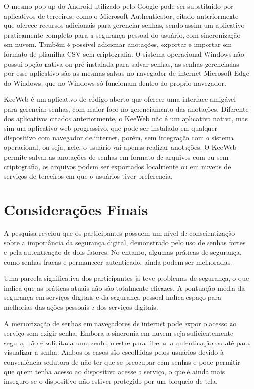 \documentclass[12pt]{article}
\begin{document}
O mesmo pop-up do Android utilizado pelo Google pode ser substituido por
aplicativos de terceiros, como o Microsoft Authenticator, citado anteriormente
que oferece recursos adicionais para gerenciar senhas, sendo assim um aplicativo
praticamente completo para a segurança pessoal do usuário, com sincronização em
nuvem.
Também é possível adicionar anotações, exportar e importar em formato de
plianilha CSV sem criptografia.
O sistema operacional Windows não possui opção nativa ou pré instalada para
salvar senhas, as senhas gerenciadas por esse aplicativo são as mesmas salvas no
navegador de internet Microsoft Edge do Windows, que no Windows só funcionam
dentro do proprio navegador.

KeeWeb é um aplicativo de código aberto que oferece uma interface amigável para
gerenciar senhas, com maior foco no gerenciamento das anotações.
Diferente dos aplicativos citados anteriormente, o KeeWeb não é um aplicativo
nativo, mas sim um aplicativo web progressivo, que pode ser instalado em qualquer
dispositivo com navegador de internet, porém, sem integração com o sistema
operacional, ou seja, nele, o usuário vai apenas realizar anotações.
O KeeWeb permite salvar as anotações de senhas em formato de arquivos com ou sem
criptografia, os arquivos podem ser exportados localmente ou em nuvens de
serviços de terceiros em que o usuários tiver preferencia.

\section{Considerações Finais}

A pesquisa revelou que os participantes possuem um nível de conscientização sobre
a importância da segurança digital, demonstrado pelo uso de senhas fortes e pela
autenticação de dois fatores.
No entanto, algumas práticas de segurança, como senhas fracas e permanecer
autenticado, ainda podem ser melhoradas.

Uma parcela significativa dos participantes já teve problemas de segurança, o que
indica que as práticas atuais não são totalmente eficazes.
A pontuação média da segurança em serviços digitais e da segurança pessoal indica
espaço para melhorias das ações pessoais e dos serviços digitais.

A memorização de senhas em navegadores de internet pode expor o acesso ao serviço
sem exigir senha.
Embora a sincronia em nuvem seja suficientemente segura, não é solicitada uma
senha mestre para liberar a autenticação ou até para visualizar a senha.
Ambos os casos são escolhidas pelos usuários devido à conveniência sedutora de não
ter que se preocupar com senhas e pode permitir que quem tenha acesso ao
dispositivo acesse o serviço, o que é ainda mais inseguro se o dispositivo não
estiver protegido por um bloqueio de tela.
\end{document}
